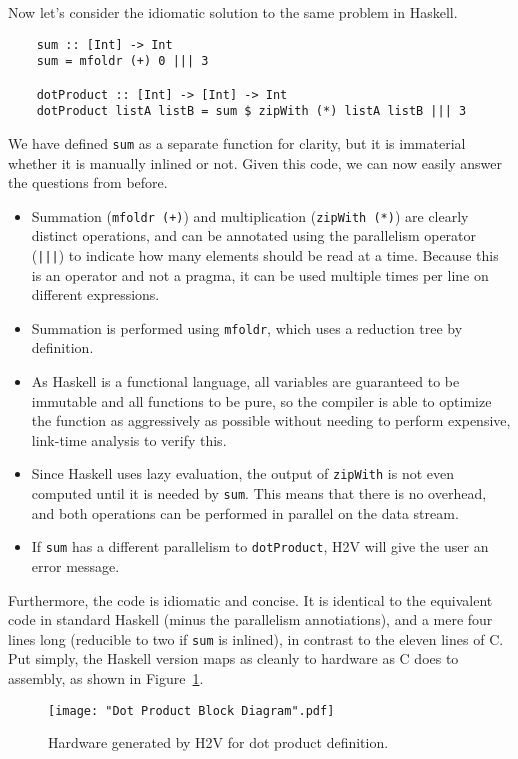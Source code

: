 \documentclass[english,onecolumn]{scrartcl}
\begin{document}
Now let's consider the idiomatic solution to the same problem in Haskell.

\begin{lstlisting}
    sum :: [Int] -> Int
    sum = mfoldr (+) 0 ||| 3

    dotProduct :: [Int] -> [Int] -> Int
    dotProduct listA listB = sum $ zipWith (*) listA listB ||| 3
\end{lstlisting}

We have defined \texttt{sum} as a separate function for clarity, but it is immaterial whether it is manually inlined or not.
Given this code, we can now easily answer the questions from before.
\begin{itemize}
    \item Summation (\texttt{mfoldr (+)}) and multiplication (\texttt{zipWith (*)}) are clearly distinct operations,
        and can be annotated using the parallelism operator (\texttt{|||}) to indicate how many elements should be read at a time.
        Because this is an operator and not a pragma, it can be used multiple times per line on different expressions.
    \item Summation is performed using \texttt{mfoldr}, which uses a reduction tree by definition.
    \item As Haskell is a functional language, all variables are guaranteed to be immutable and all functions to be pure,
        so the compiler is able to optimize the function as aggressively as possible without needing to perform expensive,
        link-time analysis to verify this.
    \item Since Haskell uses lazy evaluation, the output of \texttt{zipWith} is not even computed until it is needed by
        \texttt{sum}. This means that there is no overhead, and both operations can be performed in parallel on the data stream.
    \item If \texttt{sum} has a different parallelism to \texttt{dotProduct}, H2V will give the user an error message.
\end{itemize}

Furthermore, the code is idiomatic and concise. It is identical to the equivalent code in standard Haskell (minus the parallelism
annotiations), and a mere four lines long (reducible to two if \texttt{sum} is inlined), in contrast to the eleven lines of C.
Put simply, the Haskell version maps as cleanly to hardware as C does to assembly, as shown in Figure~\ref{fig:dotProdBD}.

\begin{figure}[h]
\texttt{[image: "Dot Product Block Diagram".pdf]}
\caption{Hardware generated by H2V for dot product definition.}
\label{fig:dotProdBD}
\end{figure}
\pagebreak{}
\end{document}

